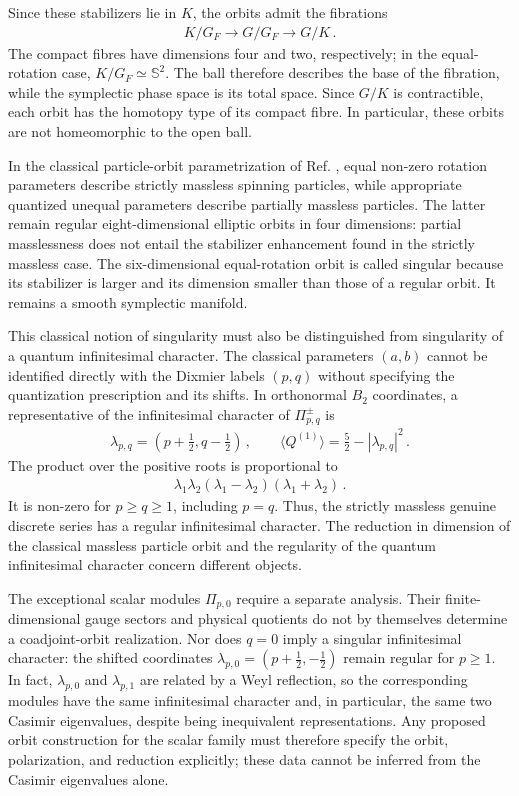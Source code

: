 \documentclass{SciPost}
\begin{document}
Since these stabilizers lie in $K$, the orbits admit the fibrations
\begin{align}
    K/G_F \longrightarrow G/G_F \longrightarrow G/K \,.
\end{align}
The compact fibres have dimensions four and two, respectively; in the equal-rotation case, $K/G_F\simeq\mathbb S^2$. The ball therefore describes the base of the fibration, while the symplectic phase space is its total space. Since $G/K$ is contractible, each orbit has the homotopy type of its compact fibre. In particular, these orbits are not homeomorphic to the open ball.

In the classical particle-orbit parametrization of Ref. \cite{BasileJoungOh2024}, equal non-zero rotation parameters describe strictly massless spinning particles, while appropriate quantized unequal parameters describe partially massless particles. The latter remain regular eight-dimensional elliptic orbits in four dimensions: partial masslessness does not entail the stabilizer enhancement found in the strictly massless case. The six-dimensional equal-rotation orbit is called singular because its stabilizer is larger and its dimension smaller than those of a regular orbit. It remains a smooth symplectic manifold.

This classical notion of singularity must also be distinguished from singularity of a quantum infinitesimal character. The classical parameters $(a,b)$ cannot be identified directly with the Dixmier labels $(p,q)$ without specifying the quantization prescription and its shifts. In orthonormal $B_2$ coordinates, a representative of the infinitesimal character of $\Pi^\pm_{p,q}$ is
\begin{align}\label{eq:HC-shift}
    \lambda_{p,q}
    =
    \left(p+\frac12,q-\frac12\right)
    \,, \qquad
    \langle Q^{(1)}\rangle
    =
    \frac52-|\lambda_{p,q}|^2 \,.
\end{align}
The product over the positive roots is proportional to
\begin{align}
    \lambda_1\lambda_2
    (\lambda_1-\lambda_2)(\lambda_1+\lambda_2) \,.
\end{align}
It is non-zero for $p\geqslant q\geqslant1$, including $p=q$. Thus, the strictly massless genuine discrete series has a regular infinitesimal character. The reduction in dimension of the classical massless particle orbit and the regularity of the quantum infinitesimal character concern different objects.

The exceptional scalar modules $\Pi_{p,0}$ require a separate analysis. Their finite-dimensional gauge sectors and physical quotients do not by themselves determine a coadjoint-orbit realization. Nor does $q=0$ imply a singular infinitesimal character: the shifted coordinates $\lambda_{p,0}=(p+\tfrac12,-\tfrac12)$ remain regular for $p\geqslant1$. In fact, $\lambda_{p,0}$ and $\lambda_{p,1}$ are related by a Weyl reflection, so the corresponding modules have the same infinitesimal character and, in particular, the same two Casimir eigenvalues, despite being inequivalent representations. Any proposed orbit construction for the scalar family must therefore specify the orbit, polarization, and reduction explicitly; these data cannot be inferred from the Casimir eigenvalues alone.
\end{document}

